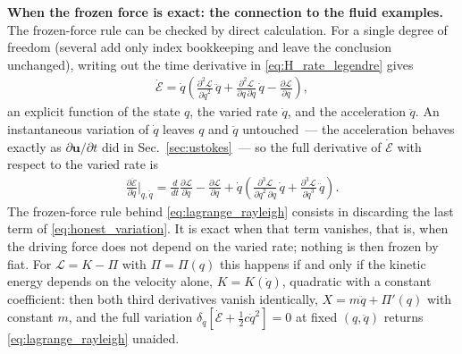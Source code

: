 \documentclass[aip,pof,reprint,amsmath,amssymb,longbibliography]{revtex4-2}
\begin{document}
\textbf{When the frozen force is exact: the connection to the fluid examples.} The frozen-force rule can be checked by direct calculation. For a single degree of freedom (several add only index bookkeeping and leave the conclusion unchanged), writing out the time derivative in \eqref{eq:H_rate_legendre} gives
\begin{align}
    \dot{\mathscr{E}} = \dot{q} \left( \frac{\partial^2 \mathscr{L}}{\partial \dot{q}^2}\, \ddot{q}
        + \frac{\partial^2 \mathscr{L}}{\partial q\, \partial \dot{q}}\, \dot{q}
        - \frac{\partial \mathscr{L}}{\partial q} \right), \label{eq:X_explicit}
\end{align}
an explicit function of the state $q$, the varied rate $\dot{q}$, and the acceleration $\ddot{q}$. An instantaneous variation of $\dot{q}$ leaves $q$ and $\ddot{q}$ untouched~--- the acceleration behaves exactly as $\partial\boldsymbol{u}/\partial t$ did in Sec.~\ref{sec:ustokes}~--- so the full derivative of $\dot{\mathscr{E}}$ with respect to the varied rate is
\begin{align}
    \frac{\partial \dot{\mathscr{E}}}{\partial \dot{q}}\bigg|_{q,\ddot{q}}
    = \frac{d}{dt}\frac{\partial \mathscr{L}}{\partial \dot{q}} - \frac{\partial \mathscr{L}}{\partial q}
    + \dot{q} \left( \frac{\partial^3 \mathscr{L}}{\partial \dot{q}^2\, \partial q}\, \dot{q}
        + \frac{\partial^3 \mathscr{L}}{\partial \dot{q}^3}\, \ddot{q} \right). \label{eq:honest_variation}
\end{align}
The frozen-force rule behind \eqref{eq:lagrange_rayleigh} consists in discarding the last term of \eqref{eq:honest_variation}. It is exact when that term vanishes, that is, when the driving force does not depend on the varied rate; nothing is then frozen by fiat. For $\mathscr{L} = K - \Pi$ with $\Pi = \Pi(q)$ this happens if and only if the kinetic energy depends on the velocity alone, $K = K(\dot{q})$, quadratic with a constant coefficient: then both third derivatives vanish identically, $X = m\ddot{q} + \Pi'(q)$ with constant $m$, and the full variation $\delta_{\dot{q}}[\dot{\mathscr{E}} + \tfrac{1}{2} c \dot{q}^2] = 0$ at fixed $(q, \ddot{q})$ returns \eqref{eq:lagrange_rayleigh} unaided.
\end{document}

